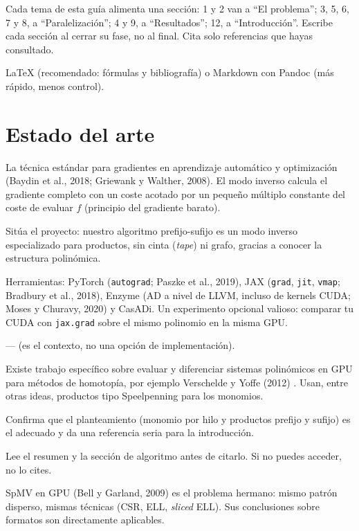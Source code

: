 \como Cada tema de esta guía alimenta una sección: 1 y 2 van a ``El problema''; 3, 5, 6, 7 y 8, a ``Paralelización''; 4 y 9, a ``Resultados''; 12, a ``Introducción''. Escribe cada sección al cerrar su fase, no al final. Cita solo referencias que hayas consultado.

\alt LaTeX (recomendado: fórmulas y bibliografía) o Markdown con Pandoc (más rápido, menos control).

\section{Estado del arte}\label{tema:arte}

\que La técnica estándar para gradientes en aprendizaje automático y optimización (Baydin et al., 2018; Griewank y Walther, 2008). El modo inverso calcula el gradiente completo con un coste acotado por un pequeño múltiplo constante del coste de evaluar $f$ (principio del gradiente barato).

\porque Sitúa el proyecto: nuestro algoritmo prefijo-sufijo es un modo inverso especializado para productos, sin cinta (\emph{tape}) ni grafo, gracias a conocer la estructura polinómica.

\como Herramientas: PyTorch (\texttt{autograd}; Paszke et al., 2019), JAX (\texttt{grad}, \texttt{jit}, \texttt{vmap}; Bradbury et al., 2018), Enzyme (AD a nivel de LLVM, incluso de kernels CUDA; Moses y Churavy, 2020) y CasADi. Un experimento opcional valioso: comparar tu CUDA con \texttt{jax.grad} sobre el mismo polinomio en la misma GPU.

\alt --- (es el contexto, no una opción de implementación).

\que Existe trabajo específico sobre evaluar y diferenciar sistemas polinómicos en GPU para métodos de homotopía, por ejemplo Verschelde y Yoffe (2012) \pv. Usan, entre otras ideas, productos tipo Speelpenning para los monomios.

\porque Confirma que el planteamiento (monomio por hilo y productos prefijo y sufijo) es el adecuado y da una referencia seria para la introducción.

\como Lee el resumen y la sección de algoritmo antes de citarlo. Si no puedes acceder, no lo cites.

\alt SpMV en GPU (Bell y Garland, 2009) es el problema hermano: mismo patrón disperso, mismas técnicas (CSR, ELL, \emph{sliced} ELL). Sus conclusiones sobre formatos son directamente aplicables.

